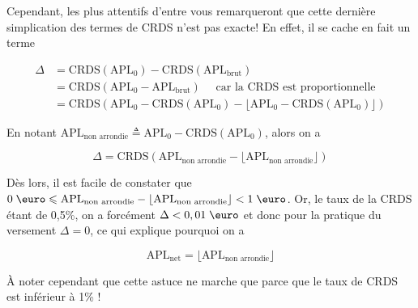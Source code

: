 \documentclass[french,11pt]{article}
\begin{document}
Cependant, les plus attentifs d'entre vous remarqueront que cette dernière simplication
des termes de CRDS n'est pas exacte! En effet, il se cache en fait un terme

\begin{align*}
  \Delta & =  \textrm{CRDS}(\textrm{APL}_0) - \textrm{CRDS}(\textrm{APL}_{\textrm{brut}} )                                                                                                 \\
         & = \textrm{CRDS}(\textrm{APL}_0 -\textrm{APL}_{\textrm{brut}}  )                                                                   \quad \text{ car la CRDS est proportionnelle} \\
         & = \textrm{CRDS}( \textrm{APL}_0 - \textrm{CRDS}(\textrm{APL}_0) - \lfloor \textrm{APL}_0 - \textrm{CRDS}(\textrm{APL}_0) \rfloor)
\end{align*}

En notant $\textrm{APL}_{\textrm{non arrondie}} \triangleq  \textrm{APL}_0 - \textrm{CRDS}(\textrm{APL}_0)$, alors on a

\[
  \Delta = \textrm{CRDS}(\textrm{APL}_{\textrm{non arrondie}} - \lfloor \textrm{APL}_{\textrm{non arrondie}} \rfloor)
\]

Dès lors, il est facile de constater que $0 \; \text{\euro} \leqslant \textrm{APL}_{\textrm{non arrondie}} - \lfloor \textrm{APL}_{\textrm{non arrondie}}\rfloor < 1 \; \text{\euro}$.
Or, le taux de la CRDS étant de 0,5\%, on a forcément $\Delta < 0,01\;\text{\euro}$ et
donc pour la pratique du versement $\Delta = 0$, ce qui explique pourquoi on a

\[
  \textrm{APL}_{\textrm{net}} = \lfloor \textrm{APL}_{\textrm{non arrondie}}\rfloor
\]

À noter cependant que cette astuce ne marche que parce que le taux de CRDS est
inférieur à 1\% !
\end{document}
